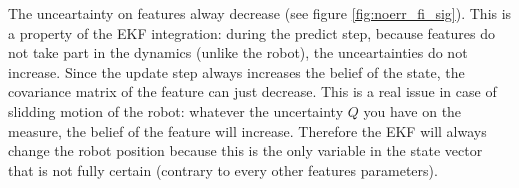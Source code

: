 \documentclass[a4paper,12pt]{article}
\begin{document}
The unceartainty on features alway decrease (see figure \ref{fig:noerr_fi_sig}). This is a property of the EKF integration: during the predict step, because features do not take part in the dynamics (unlike the robot), the unceartainties do not increase. Since the update step always increases the belief of the state, the covariance matrix of the feature can just decrease.
This is a real issue in case of slidding motion of the robot: whatever the uncertainty $Q$ you have on the measure, the belief of the feature will increase. Therefore the EKF will always change the robot position because this is the only variable in the state vector that is not fully certain (contrary to every other features parameters).


\begin{figure}
        \centering
        
        ~ %
          

\end{figure}
\end{document}
